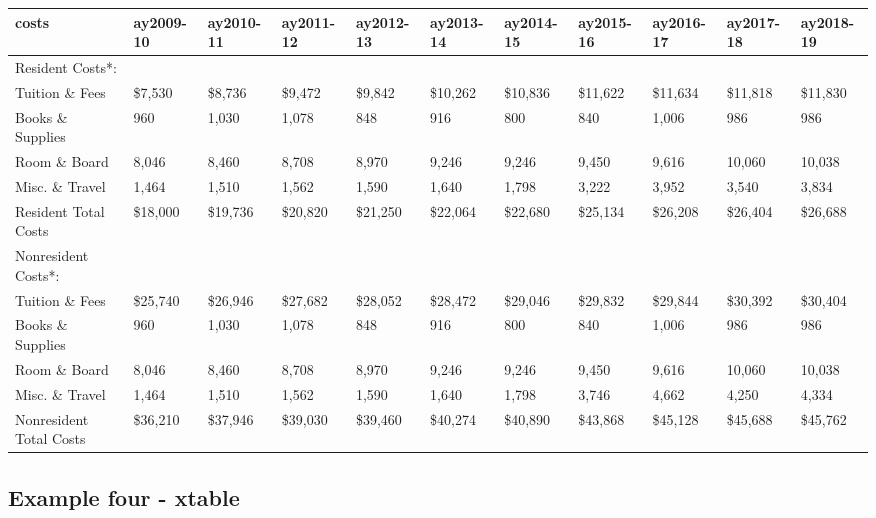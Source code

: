 \documentclass[
]{book}
\begin{document}
\begin{tabular}{l|l|l|l|l|l|l|l|l|l|l}
\hline
costs & ay2009-10 & ay2010-11 & ay2011-12 & ay2012-13 & ay2013-14 & ay2014-15 & ay2015-16 & ay2016-17 & ay2017-18 & ay2018-19\\
\hline
Resident Costs*: &  &  &  &  &  &  &  &  &  & \\
\hline
Tuition \& Fees & \$7,530 & \$8,736 & \$9,472 & \$9,842 & \$10,262 & \$10,836 & \$11,622 & \$11,634 & \$11,818 & \$11,830\\
\hline
Books \& Supplies & 960 & 1,030 & 1,078 & 848 & 916 & 800 & 840 & 1,006 & 986 & 986\\
\hline
Room \& Board & 8,046 & 8,460 & 8,708 & 8,970 & 9,246 & 9,246 & 9,450 & 9,616 & 10,060 & 10,038\\
\hline
Misc. \& Travel & 1,464 & 1,510 & 1,562 & 1,590 & 1,640 & 1,798 & 3,222 & 3,952 & 3,540 & 3,834\\
\hline
Resident Total Costs & \$18,000 & \$19,736 & \$20,820 & \$21,250 & \$22,064 & \$22,680 & \$25,134 & \$26,208 & \$26,404 & \$26,688\\
\hline
Nonresident Costs*: &  &  &  &  &  &  &  &  &  & \\
\hline
Tuition \& Fees & \$25,740 & \$26,946 & \$27,682 & \$28,052 & \$28,472 & \$29,046 & \$29,832 & \$29,844 & \$30,392 & \$30,404\\
\hline
Books \& Supplies & 960 & 1,030 & 1,078 & 848 & 916 & 800 & 840 & 1,006 & 986 & 986\\
\hline
Room \& Board & 8,046 & 8,460 & 8,708 & 8,970 & 9,246 & 9,246 & 9,450 & 9,616 & 10,060 & 10,038\\
\hline
Misc. \& Travel & 1,464 & 1,510 & 1,562 & 1,590 & 1,640 & 1,798 & 3,746 & 4,662 & 4,250 & 4,334\\
\hline
Nonresident Total Costs & \$36,210 & \$37,946 & \$39,030 & \$39,460 & \$40,274 & \$40,890 & \$43,868 & \$45,128 & \$45,688 & \$45,762\\
\hline
\end{tabular}

\hypertarget{example-four---xtable}{%
\subsection{Example four - xtable}\label{example-four---xtable}}
\end{document}
